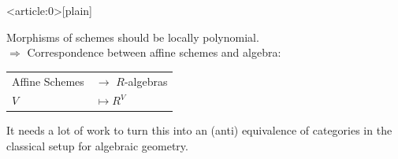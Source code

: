 \documentclass{beamer}
\begin{document}
{ %
    \begin{frame}<article:0>[plain]
     \end{frame}
}

\begin{frame}
  Morphisms of schemes should be locally polynomial. \\
  \pause
  $\Rightarrow$ Correspondence between affine schemes and algebra: \\
  \pause
  \begin{center}
    \begin{tabular}{ll}
      Affine Schemes & $\to$ $R$-algebras \\
      $V$ & $\mapsto R^V$
    \end{tabular}
  \end{center}
  \pause
  It needs a lot of work to turn this into an (anti) equivalence of categories in the classical setup for algebraic geometry.
\end{frame}
\end{document}
